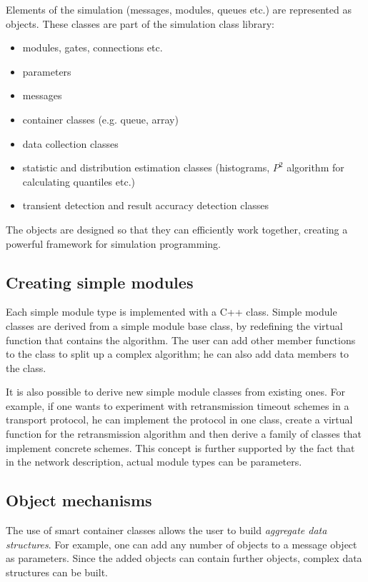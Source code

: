 Elements of the simulation (messages, modules, queues etc.) are
represented as objects. These classes are part of the simulation
class library:
\begin{itemize}
\item{modules, gates, connections etc.}
\item{parameters}
\item{messages}
\item{container classes (e.g. queue, array)}
\item{data collection classes}
\item{statistic and distribution estimation classes (histograms, $P^{2}$
algorithm for calculating quantiles etc.)}
\item{transient detection and result accuracy detection classes}
\end{itemize}

The objects are designed so that they can efficiently work together,
creating a powerful framework for simulation programming.


\subsection{Creating simple modules}

Each simple module type is implemented with a C++ class. Simple
module classes are derived from a simple module base class, by
redefining the virtual function that contains the algorithm.
The user can add other member functions to the class to split
up a complex algorithm; he can also add data members to the class.

It is also possible to derive new simple module classes from
existing ones. For example, if one wants to experiment with retransmission
timeout schemes in a transport protocol, he can implement the
protocol in one class, create a virtual function for the retransmission
algorithm and then derive a family of classes that implement
concrete schemes. This concept is further supported by the fact
that in the network description, actual module types can be parameters.


\subsection{Object mechanisms}

The use of smart container classes allows the user to build
\textit{aggregate data structures}.
For example, one can add any number of objects to a message object as
parameters. Since the added objects can contain further objects,
complex data structures can be built.

